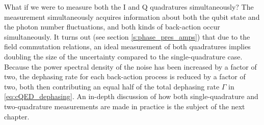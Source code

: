 What if we were to measure both the I and Q quadratures simultaneously?  The measurement simultaneously acquires information about both the qubit state and the photon number fluctuations, and both kinds of back-action occur simultaneously.  It turns out (see section \ref{s:phase_pres_amps}) that due to the field commutation relations, an ideal measurement of both quadratures implies doubling the size of the uncertainty compared to the single-quadrature case.  Because the power spectral density of the noise has been increased by a factor of two, the dephasing rate for each back-action process is reduced by a factor of two, both then contributing an equal half of the total dephasing rate $\Gamma$ in \eqref{eq:cQED_dephasing}.  An in-depth discussion of how both single-quadrature and two-quadrature measurements are made in practice is the subject of the next chapter.































